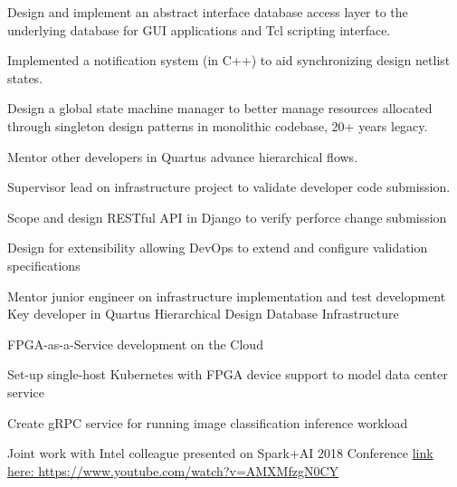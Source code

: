 \documentclass[12pt, letterpaper]{awesome-cv}
\begin{document}
\begin{cventries}
{\begin{cvdescription}
			\end{cvdescription}
			\begin{cvitems}
				\item {Design and implement an abstract interface database access layer to the underlying database for GUI applications and Tcl scripting interface.}
				\item {Implemented a notification system (in C++) to aid synchronizing design netlist states.}
				\item {Design a global state machine manager to better manage resources allocated through singleton design patterns in monolithic codebase, 20+ years legacy.}
				\item {Mentor other developers in Quartus advance hierarchical flows.}
			\end{cvitems}
			\begin{cvsubdescription}
				Supervisor lead on infrastructure project to validate developer code submission.
			\end{cvsubdescription}
			\begin{cvitems}
				\item {Scope and design RESTful API in Django to verify perforce change submission}
				\item {Design for extensibility allowing DevOps to extend and configure validation specifications}
				\item {Mentor junior engineer on infrastructure implementation and test development Key developer in Quartus Hierarchical Design Database Infrastructure}
			\end{cvitems}
			\begin{cvsubdescription}
				FPGA-as-a-Service development on the Cloud
			\end{cvsubdescription}
			\begin{cvitems}
				\item {Set-up single-host Kubernetes with FPGA device support to model data center service}
				\item {Create gRPC service for running image classification inference workload}
				\item {Joint work with Intel colleague presented on Spark+AI 2018 Conference {\href{https://www.youtube.com/watch?v=AMXMfzgN0CY}{link here: https://www.youtube.com/watch?v=AMXMfzgN0CY}}}
			\end{cvitems}
		}


\end{cventries}
\end{document}

